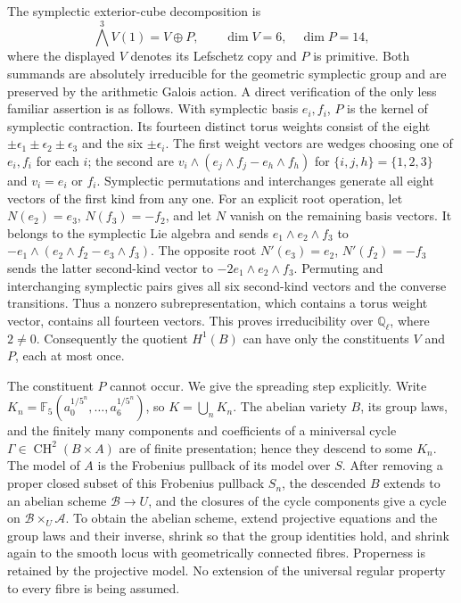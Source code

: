 The symplectic exterior-cube decomposition is
\[
 \bigwedge^3V(1)=V\oplus P,
 \qquad \dim V=6,\quad \dim P=14,
\]
where the displayed $V$ denotes its Lefschetz copy and $P$ is
primitive.  Both summands are absolutely irreducible for the
geometric symplectic group and are preserved by the arithmetic
Galois action.  A direct verification of the only less familiar
assertion is as follows.  With symplectic basis $e_i,f_i$, $P$
is the kernel of symplectic contraction.  Its fourteen distinct
torus weights consist of the eight $\pm\epsilon_1\pm\epsilon_2
\pm\epsilon_3$ and the six $\pm\epsilon_i$.  The first weight
vectors are wedges choosing one of $e_i,f_i$ for each $i$; the
second are $v_i\wedge(e_j\wedge f_j-e_h\wedge f_h)$ for
$\{i,j,h\}=\{1,2,3\}$ and $v_i=e_i$ or $f_i$.
Symplectic permutations and interchanges generate all eight
vectors of the first kind from any one.  For an explicit root operation, let $N(e_2)=e_3$,
$N(f_3)=-f_2$, and let $N$ vanish on the remaining basis
vectors.  It belongs to the symplectic Lie algebra and sends
$e_1\wedge e_2\wedge f_3$ to
$-e_1\wedge(e_2\wedge f_2-e_3\wedge f_3)$.
The opposite root $N'(e_3)=e_2$, $N'(f_2)=-f_3$ sends the
latter second-kind vector to $-2e_1\wedge e_2\wedge f_3$.
Permuting and interchanging symplectic pairs gives all six
second-kind vectors and the converse transitions.  Thus a nonzero
subrepresentation, which contains a torus weight vector, contains
all fourteen vectors.  This proves irreducibility over
$\mathbb Q_\ell$, where $2\ne0$.
Consequently the quotient $H^1(B)$ can have only the constituents
$V$ and $P$, each at most once.

The constituent $P$ cannot occur.  We give the spreading
step explicitly.  Write
$K_n=\mathbb F_5(a_0^{1/5^n},\ldots,a_6^{1/5^n})$, so
$K=\bigcup_nK_n$.  The abelian variety $B$, its group laws,
and the finitely many components and coefficients of a
miniversal cycle $\Gamma\in\operatorname{CH}^2(B\times A)$
are of finite presentation; hence they descend to some $K_n$.
The model of $A$ is the Frobenius pullback of its model over
$S$.  After removing a proper closed subset of this Frobenius
pullback $S_n$, the descended $B$ extends to an abelian scheme
$\mathcal B\to U$, and the closures of the cycle components
give a cycle on $\mathcal B\times_U\mathcal A$.  To obtain
the abelian scheme, extend projective equations and the group
laws and their inverse, shrink so that the group identities
hold, and shrink again to the smooth locus with geometrically
connected fibres.  Properness is retained by the projective
model.  No extension of the universal regular property to every
fibre is being assumed.

